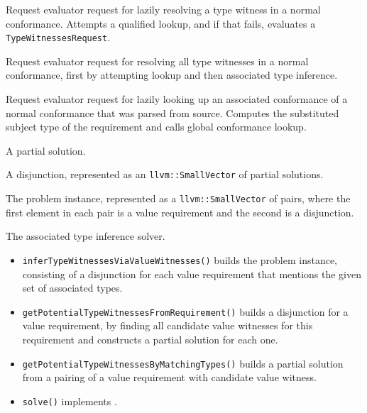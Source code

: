 \documentclass[../generics]{subfiles}
\begin{document}
Request evaluator request for lazily resolving a type witness in a normal conformance. Attempts a qualified lookup, and if that fails, evaluates a \texttt{TypeWitnessesRequest}.

Request evaluator request for resolving all type witnesses in a normal conformance, first by attempting lookup and then associated type inference.

Request evaluator request for lazily looking up an associated conformance of a normal conformance that was parsed from source. Computes the substituted subject type of the requirement and calls global conformance lookup.

A partial solution.

A disjunction, represented as an \verb|llvm::SmallVector| of partial solutions.

The problem instance, represented as a \verb|llvm::SmallVector| of pairs, where the first element in each pair is a value requirement and the second is a disjunction.

The associated type inference solver.
\begin{itemize}
\item \texttt{inferTypeWitnessesViaValueWitnesses()} builds the problem instance, consisting of a disjunction for each value requirement that mentions the given set of associated types.
\item \texttt{getPotentialTypeWitnessesFromRequirement()} builds a disjunction for a value requirement, by finding all candidate value witnesses for this requirement and constructs a partial solution for each one.
\item \texttt{getPotentialTypeWitnessesByMatchingTypes()} builds a partial solution from a pairing of a value requirement with candidate value witness.
\item \texttt{solve()} implements .
\end{itemize}
\end{document}
